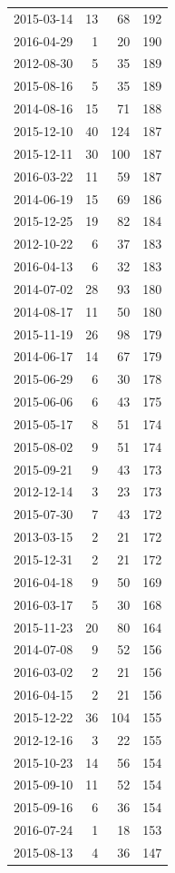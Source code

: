 \begin{tabular}{lrrr}
2015-03-14 & 13 & 68 & 192 \\
2016-04-29 & 1 & 20 & 190 \\
2012-08-30 & 5 & 35 & 189 \\
2015-08-16 & 5 & 35 & 189 \\
2014-08-16 & 15 & 71 & 188 \\
2015-12-10 & 40 & 124 & 187 \\
2015-12-11 & 30 & 100 & 187 \\
2016-03-22 & 11 & 59 & 187 \\
2014-06-19 & 15 & 69 & 186 \\
2015-12-25 & 19 & 82 & 184 \\
2012-10-22 & 6 & 37 & 183 \\
2016-04-13 & 6 & 32 & 183 \\
2014-07-02 & 28 & 93 & 180 \\
2014-08-17 & 11 & 50 & 180 \\
2015-11-19 & 26 & 98 & 179 \\
2014-06-17 & 14 & 67 & 179 \\
2015-06-29 & 6 & 30 & 178 \\
2015-06-06 & 6 & 43 & 175 \\
2015-05-17 & 8 & 51 & 174 \\
2015-08-02 & 9 & 51 & 174 \\
2015-09-21 & 9 & 43 & 173 \\
2012-12-14 & 3 & 23 & 173 \\
2015-07-30 & 7 & 43 & 172 \\
2013-03-15 & 2 & 21 & 172 \\
2015-12-31 & 2 & 21 & 172 \\
2016-04-18 & 9 & 50 & 169 \\
2016-03-17 & 5 & 30 & 168 \\
2015-11-23 & 20 & 80 & 164 \\
2014-07-08 & 9 & 52 & 156 \\
2016-03-02 & 2 & 21 & 156 \\
2016-04-15 & 2 & 21 & 156 \\
2015-12-22 & 36 & 104 & 155 \\
2012-12-16 & 3 & 22 & 155 \\
2015-10-23 & 14 & 56 & 154 \\
2015-09-10 & 11 & 52 & 154 \\
2015-09-16 & 6 & 36 & 154 \\
2016-07-24 & 1 & 18 & 153 \\
2015-08-13 & 4 & 36 & 147 \\

\end{tabular}
